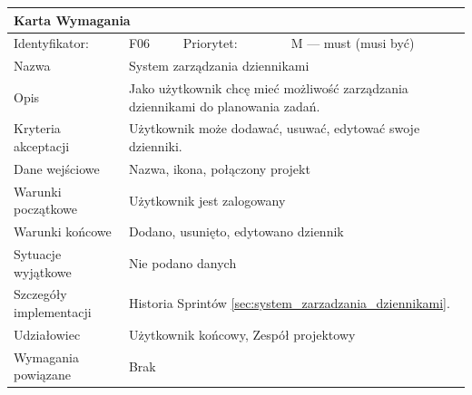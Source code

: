 \documentclass[a4paper,11pt]{report}
\begin{document}
		\begin{tabular}{|p{3cm}|p{2cm}|p{2cm}|p{6cm}|}
		\hline
		\multicolumn{4}{|p{12 cm}|}{Karta Wymagania}\\
		\hline
		Identyfikator: & F06 & Priorytet: & M — must (musi być)\\
		\hline
		Nazwa & \multicolumn{3}{|p{10 cm}|}{System zarządzania dziennikami}\\
		\hline
		Opis & \multicolumn{3}{|p{10 cm}|}{Jako użytkownik chcę mieć możliwość zarządzania dziennikami do planowania zadań.}\\
		\hline
		Kryteria akceptacji & \multicolumn{3}{|p{10 cm}|}{Użytkownik może dodawać, usuwać, edytować swoje dzienniki.}\\
		\hline
		Dane wejściowe & \multicolumn{3}{|p{10 cm}|}{Nazwa, ikona, połączony projekt}\\
		\hline
		Warunki początkowe & \multicolumn{3}{|p{10 cm}|}{Użytkownik jest zalogowany}\\
		\hline
		Warunki końcowe & \multicolumn{3}{|p{10 cm}|}{Dodano, usunięto, edytowano dziennik}\\
		\hline
		Sytuacje wyjątkowe & \multicolumn{3}{|p{10 cm}|}{Nie podano danych}\\
		\hline
		Szczegóły implementacji & \multicolumn{3}{|p{10 cm}|}{Historia Sprintów \ref{sec:system_zarzadzania_dziennikami}.}\\
		\hline
		Udziałowiec & \multicolumn{3}{|p{10 cm}|}{Użytkownik końcowy, Zespół projektowy}\\
		\hline
		Wymagania powiązane & \multicolumn{3}{|p{10 cm}|}{Brak}\\
		\hline
		\end{tabular}
		\newline
		\vspace*{0,2 cm}
		\newline
\end{document}
